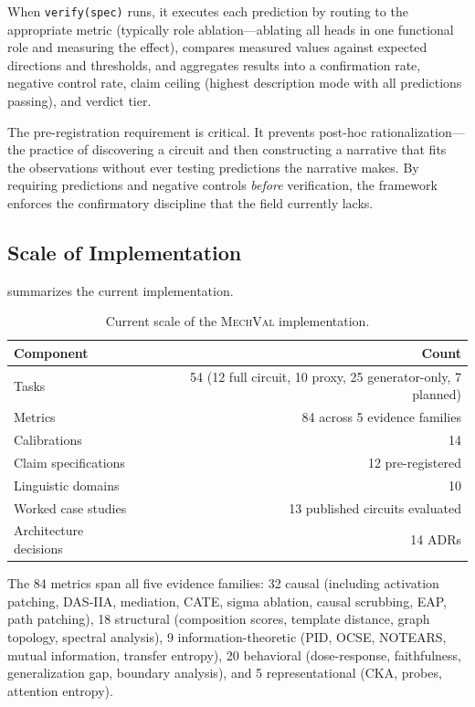 \documentclass[10pt]{article}
\newcommand{\mechval}{\textsc{MechVal}}
\newcommand{\tighttable}{\setlength{\tabcolsep}{4pt}\renewcommand{\arraystretch}{1.05}}
\begin{document}
When \texttt{verify(spec)} runs, it executes each prediction by routing to the appropriate metric (typically role ablation---ablating all heads in one functional role and measuring the effect), compares measured values against expected directions and thresholds, and aggregates results into a confirmation rate, negative control rate, claim ceiling (highest description mode with all predictions passing), and verdict tier.

The pre-registration requirement is critical. It prevents post-hoc rationalization---the practice of discovering a circuit and then constructing a narrative that fits the observations without ever testing predictions the narrative makes. By requiring predictions and negative controls \emph{before} verification, the framework enforces the confirmatory discipline that the field currently lacks.

\subsection{Scale of Implementation}
\label{sec:scale}

 summarizes the current implementation.

\begin{table}[t]
\centering
\tighttable
\caption{Current scale of the \mechval{} implementation.}
\label{tab:scale}
\small
\begin{tabular}{@{}lr@{}}
\toprule
\textbf{Component} & \textbf{Count} \\
\midrule
Tasks & 54 (12 full circuit, 10 proxy, 25 generator-only, 7 planned) \\
Metrics & 84 across 5 evidence families \\
Calibrations & 14 \\
Claim specifications & 12 pre-registered \\
Linguistic domains & 10 \\
Worked case studies & 13 published circuits evaluated \\
Architecture decisions & 14 ADRs \\
\bottomrule
\end{tabular}
\end{table}

The 84 metrics span all five evidence families: 32 causal (including activation patching, DAS-IIA, mediation, CATE, sigma ablation, causal scrubbing, EAP, path patching), 18 structural (composition scores, template distance, graph topology, spectral analysis), 9 information-theoretic (PID, OCSE, NOTEARS, mutual information, transfer entropy), 20 behavioral (dose-response, faithfulness, generalization gap, boundary analysis), and 5 representational (CKA, probes, attention entropy).
\end{document}
